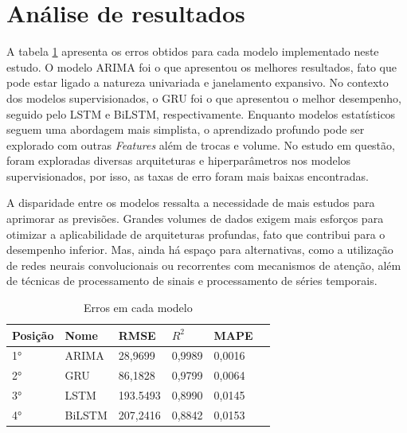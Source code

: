 \section{Análise de resultados}

  A tabela \ref{tab:erros} apresenta os erros obtidos para cada modelo implementado neste estudo. O modelo ARIMA foi o que apresentou os melhores resultados, fato que pode estar ligado a natureza univariada e janelamento expansivo.
  No contexto dos modelos supervisionados, o GRU foi o que apresentou o melhor desempenho, seguido pelo LSTM e BiLSTM, respectivamente.
  Enquanto modelos estatísticos seguem uma abordagem mais simplista, o aprendizado profundo pode ser explorado com outras \textit{Features} além de trocas e volume.
 No estudo em questão, foram exploradas diversas arquiteturas e hiperparâmetros nos modelos supervisionados, por isso, as taxas de erro foram mais baixas encontradas.

A disparidade entre os modelos ressalta a necessidade de mais estudos para aprimorar as previsões.
Grandes volumes de dados exigem mais esforços para otimizar a aplicabilidade de arquiteturas profundas, fato que contribui para o desempenho inferior.
  Mas, ainda há espaço para alternativas, como a utilização de redes neurais convolucionais ou recorrentes com mecanismos de atenção, além de técnicas de processamento de sinais e processamento de séries temporais.
  
\begin{table}[!htb]
  \caption{Erros em cada modelo} \label{tab:erros}
  \begin{tabularx}{\textwidth}{X|X|X|X|X|X}
  \hline
  Posição & Nome & RMSE & $R^2$ & MAPE \\ \hline
  1° & ARIMA   & 28,9699      & 0,9989           & 0,0016             \\ \hline
  2° & GRU   & 86,1828      & 0,9799             & 0,0064             \\ \hline
  3° & LSTM   & 193.5493      &  0,8990           & 0,0145                \\ \hline
  4° & BiLSTM   & 207,2416    & 0,8842            & 0,0153           \\ \hline
  \end{tabularx}
\end{table}